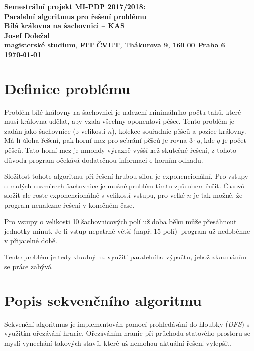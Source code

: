 \documentclass[czech]{article}
\begin{document}
\begin{center}\large
\bf Semestrální projekt MI-PDP 2017/2018:\\[6mm]
    Paralelní algoritmus pro řešení problému\\[3mm]
    Bílá královna na šachovnici -- KAS\\[6mm]
    Josef Doležal\\[2mm]
    magisterské studium, FIT ČVUT, Thákurova 9, 160 00 Praha 6\\[2mm]
    \today
\end{center}

\thispagestyle{empty}
\newpage

\section{Definice problému}

Problém bílé královny na šachovnici je nalezení minimálního počtu tahů, které musí královna udělat, aby vzala všechny oponentovi pěšce.
Tento problém je zadán jako šachovnice (o velikosti $n$), kolekce souřadnic pěšců a pozice královny.
Má-li úloha řešení, pak horní mez pro sebrání pěšců je rovna $3 \cdot q$, kde $q$ je počet pěšců.
Tato horní mez je mnohdy výrazně vyšší než skutečné řešení, z tohoto důvodu program očekává dodatečnou informaci o horním odhadu.

Složitost tohoto algoritmu při řešení hrubou silou je exponencionální.
Pro vstupy o malých rozměrech šachovnice je možné problém tímto způsobem řešit.
Časová složit ale roste exponencionálně s velikostí vstupu, pro velké $n$ je tak možné, že program nenalezne řešení v konečném čase.

Pro vstupy o velikosti 10 šachovnicových polí už doba běhu může přesáhnout jednotky minut.
Je-li vstup nepatrně větší (např. 15 polí), program už nedoběhne v přijatelné době.

Tento problém je tedy vhodný na využití paralelního výpočtu, jehož zkoumáním se práce zabývá.

\section{Popis sekvenčního algoritmu}

Sekvenční algoritmus je implementován pomocí prohledávání do hloubky (\textit{DFS}) s využitím ořezávání hranic.
Ořezáváním hranic při průchodu statového prostoru se myslí vynechání takových stavů, které už nemohou aktuální řešení vylepšit.
\end{document}
